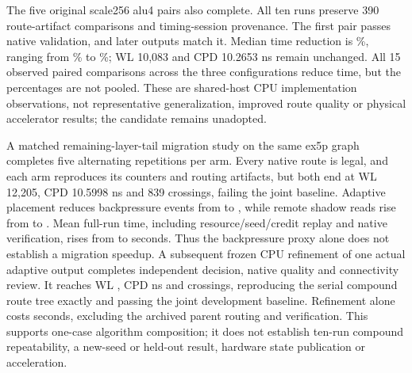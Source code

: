 \documentclass[10pt]{article}
\begin{document}
The five original scale256 alu4 pairs also complete. All ten runs preserve
390 route-artifact comparisons and timing-session provenance. The first
pair passes native validation, and later outputs match it. Median time
reduction is \AluHashMedianReduction{}\%, ranging from
\AluHashMinimumReduction{}\% to \AluHashMaximumReduction{}\%; WL 10,083
and CPD 10.2653 ns remain unchanged. All 15 observed paired comparisons
across the three configurations reduce time, but the percentages are not
pooled. These are shared-host CPU implementation observations, not
representative generalization, improved route quality or physical
accelerator results; the candidate remains unadopted.

A matched remaining-layer-tail migration study on the same ex5p graph
completes five alternating repetitions per arm. Every native route is legal,
and each arm reproduces its counters and routing artifacts, but both end at
WL 12,205, CPD 10.5998 ns and 839 crossings, failing the joint baseline.
Adaptive placement reduces backpressure events from
\TailStaticBackpressure{} to \TailAdaptiveBackpressure{}, while remote shadow
reads rise from \TailStaticRemoteReads{} to \TailAdaptiveRemoteReads{}.
Mean full-run time, including resource/seed/credit replay and native
verification, rises from \TailStaticSeconds{} to \TailAdaptiveSeconds{}
seconds. Thus the backpressure proxy alone does not establish a migration
speedup. A subsequent frozen CPU refinement of one actual adaptive output
completes independent decision, native quality and connectivity review.
It reaches WL \RefreshedExWL{}, CPD \RefreshedExCPD{} ns and
\RefreshedExCrossings{} crossings, reproducing the serial compound route
tree exactly and passing the joint development baseline. Refinement alone
costs \AdaptiveRefinementSeconds{} seconds, excluding the archived parent
routing and verification. This supports one-case algorithm composition;
it does not establish ten-run compound repeatability, a new-seed or
held-out result, hardware state publication or acceleration.
\end{document}
